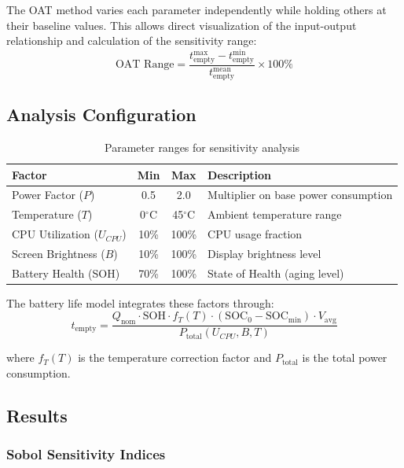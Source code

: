 The OAT method varies each parameter independently while holding others at their baseline values. This allows direct visualization of the input-output relationship and calculation of the sensitivity range:
\begin{equation}
    \text{OAT Range} = \frac{t_{\text{empty}}^{\max} - t_{\text{empty}}^{\min}}{t_{\text{empty}}^{\text{mean}}} \times 100\%
\end{equation}

\subsection{Analysis Configuration}

\begin{table}[H]
\centering
\caption{Parameter ranges for sensitivity analysis}
\label{tab:sa_params}
\begin{tabular}{@{}lccl@{}}
\toprule
\textbf{Factor} & \textbf{Min} & \textbf{Max} & \textbf{Description} \\
\midrule
Power Factor ($P$) & 0.5 & 2.0 & Multiplier on base power consumption \\
Temperature ($T$) & 0$^\circ$C & 45$^\circ$C & Ambient temperature range \\
CPU Utilization ($U_{CPU}$) & 10\% & 100\% & CPU usage fraction \\
Screen Brightness ($B$) & 10\% & 100\% & Display brightness level \\
Battery Health (SOH) & 70\% & 100\% & State of Health (aging level) \\
\bottomrule
\end{tabular}
\end{table}

The battery life model integrates these factors through:
\begin{equation}
    t_{\text{empty}} = \frac{Q_{\text{nom}} \cdot \text{SOH} \cdot f_T(T) \cdot (\text{SOC}_0 - \text{SOC}_{\min}) \cdot V_{\text{avg}}}{P_{\text{total}}(U_{CPU}, B, T)}
\end{equation}

where $f_T(T)$ is the temperature correction factor and $P_{\text{total}}$ is the total power consumption.

\subsection{Results}

\subsubsection{Sobol Sensitivity Indices}

